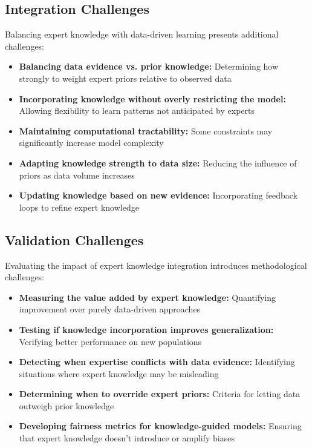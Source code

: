 \subsection{Integration Challenges}

Balancing expert knowledge with data-driven learning presents additional challenges:

\begin{itemize}
    \item \textbf{Balancing data evidence vs. prior knowledge:} Determining how strongly to weight expert priors relative to observed data
    \item \textbf{Incorporating knowledge without overly restricting the model:} Allowing flexibility to learn patterns not anticipated by experts
    \item \textbf{Maintaining computational tractability:} Some constraints may significantly increase model complexity
    \item \textbf{Adapting knowledge strength to data size:} Reducing the influence of priors as data volume increases
    \item \textbf{Updating knowledge based on new evidence:} Incorporating feedback loops to refine expert knowledge
\end{itemize}

\subsection{Validation Challenges}

Evaluating the impact of expert knowledge integration introduces methodological challenges:

\begin{itemize}
    \item \textbf{Measuring the value added by expert knowledge:} Quantifying improvement over purely data-driven approaches
    \item \textbf{Testing if knowledge incorporation improves generalization:} Verifying better performance on new populations
    \item \textbf{Detecting when expertise conflicts with data evidence:} Identifying situations where expert knowledge may be misleading
    \item \textbf{Determining when to override expert priors:} Criteria for letting data outweigh prior knowledge
    \item \textbf{Developing fairness metrics for knowledge-guided models:} Ensuring that expert knowledge doesn't introduce or amplify biases
\end{itemize}

